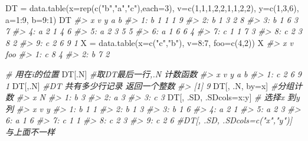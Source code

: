 \documentclass[
]{book}
\newenvironment{Shaded}{\begin{snugshade}}{\end{snugshade}}
\newcommand{\AttributeTok}[1]{\textcolor[rgb]{0.77,0.63,0.00}{#1}}
\newcommand{\CommentTok}[1]{\textcolor[rgb]{0.56,0.35,0.01}{\textit{#1}}}
\newcommand{\DecValTok}[1]{\textcolor[rgb]{0.00,0.00,0.81}{#1}}
\newcommand{\FunctionTok}[1]{\textcolor[rgb]{0.00,0.00,0.00}{#1}}
\newcommand{\NormalTok}[1]{#1}
\newcommand{\OtherTok}[1]{\textcolor[rgb]{0.56,0.35,0.01}{#1}}
\newcommand{\SpecialCharTok}[1]{\textcolor[rgb]{0.00,0.00,0.00}{#1}}
\newcommand{\StringTok}[1]{\textcolor[rgb]{0.31,0.60,0.02}{#1}}
\begin{document}
\begin{Shaded}
\begin{Highlighting}[]
\NormalTok{DT }\OtherTok{=} \FunctionTok{data.table}\NormalTok{(}\AttributeTok{x=}\FunctionTok{rep}\NormalTok{(}\FunctionTok{c}\NormalTok{(}\StringTok{"b"}\NormalTok{,}\StringTok{"a"}\NormalTok{,}\StringTok{"c"}\NormalTok{),}\AttributeTok{each=}\DecValTok{3}\NormalTok{), }\AttributeTok{v=}\FunctionTok{c}\NormalTok{(}\DecValTok{1}\NormalTok{,}\DecValTok{1}\NormalTok{,}\DecValTok{1}\NormalTok{,}\DecValTok{2}\NormalTok{,}\DecValTok{2}\NormalTok{,}\DecValTok{1}\NormalTok{,}\DecValTok{1}\NormalTok{,}\DecValTok{2}\NormalTok{,}\DecValTok{2}\NormalTok{), }\AttributeTok{y=}\FunctionTok{c}\NormalTok{(}\DecValTok{1}\NormalTok{,}\DecValTok{3}\NormalTok{,}\DecValTok{6}\NormalTok{), }\AttributeTok{a=}\DecValTok{1}\SpecialCharTok{:}\DecValTok{9}\NormalTok{, }\AttributeTok{b=}\DecValTok{9}\SpecialCharTok{:}\DecValTok{1}\NormalTok{)}
\NormalTok{DT}
\CommentTok{\#\textgreater{}    x v y a b}
\CommentTok{\#\textgreater{} 1: b 1 1 1 9}
\CommentTok{\#\textgreater{} 2: b 1 3 2 8}
\CommentTok{\#\textgreater{} 3: b 1 6 3 7}
\CommentTok{\#\textgreater{} 4: a 2 1 4 6}
\CommentTok{\#\textgreater{} 5: a 2 3 5 5}
\CommentTok{\#\textgreater{} 6: a 1 6 6 4}
\CommentTok{\#\textgreater{} 7: c 1 1 7 3}
\CommentTok{\#\textgreater{} 8: c 2 3 8 2}
\CommentTok{\#\textgreater{} 9: c 2 6 9 1}
\NormalTok{X }\OtherTok{=} \FunctionTok{data.table}\NormalTok{(}\AttributeTok{x=}\FunctionTok{c}\NormalTok{(}\StringTok{"c"}\NormalTok{,}\StringTok{"b"}\NormalTok{), }\AttributeTok{v=}\DecValTok{8}\SpecialCharTok{:}\DecValTok{7}\NormalTok{, }\AttributeTok{foo=}\FunctionTok{c}\NormalTok{(}\DecValTok{4}\NormalTok{,}\DecValTok{2}\NormalTok{))}
\NormalTok{X}
\CommentTok{\#\textgreater{}    x v foo}
\CommentTok{\#\textgreater{} 1: c 8   4}
\CommentTok{\#\textgreater{} 2: b 7   2}

\CommentTok{\# 用在i的位置}
\NormalTok{DT[.N] }\CommentTok{\#取DT最后一行,.N 计数函数}
\CommentTok{\#\textgreater{}    x v y a b}
\CommentTok{\#\textgreater{} 1: c 2 6 9 1}
\NormalTok{DT[,.N] }\CommentTok{\#DT 共有多少行记录 返回一个整数}
\CommentTok{\#\textgreater{} [1] 9}
\NormalTok{DT[, .N, by}\OtherTok{=}\NormalTok{x]  }\CommentTok{\#分组计数}
\CommentTok{\#\textgreater{}    x N}
\CommentTok{\#\textgreater{} 1: b 3}
\CommentTok{\#\textgreater{} 2: a 3}
\CommentTok{\#\textgreater{} 3: c 3}
\NormalTok{DT[, .SD, .SDcols}\OtherTok{=}\NormalTok{x}\SpecialCharTok{:}\NormalTok{y]  }\CommentTok{\# 选择x 到y 列}
\CommentTok{\#\textgreater{}    x v y}
\CommentTok{\#\textgreater{} 1: b 1 1}
\CommentTok{\#\textgreater{} 2: b 1 3}
\CommentTok{\#\textgreater{} 3: b 1 6}
\CommentTok{\#\textgreater{} 4: a 2 1}
\CommentTok{\#\textgreater{} 5: a 2 3}
\CommentTok{\#\textgreater{} 6: a 1 6}
\CommentTok{\#\textgreater{} 7: c 1 1}
\CommentTok{\#\textgreater{} 8: c 2 3}
\CommentTok{\#\textgreater{} 9: c 2 6}
\CommentTok{\#DT[, .SD, .SDcols=c("x","y")] 与上面不一样}


\end{Highlighting}
\end{Shaded}
\end{document}
